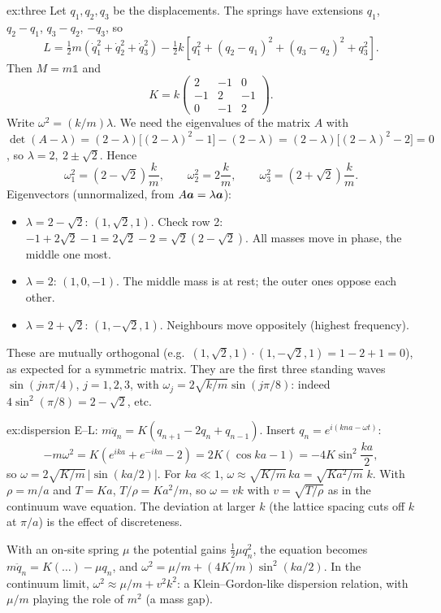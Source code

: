 \documentclass[11pt]{article}
\begin{document}
\begin{solution}{ex:three}
Let $q_1,q_2,q_3$ be the displacements. The springs have extensions $q_1$, $q_2-q_1$, $q_3-q_2$, $-q_3$, so
\[
 L=\tfrac12m(\dot q_1^2+\dot q_2^2+\dot q_3^2)-\tfrac12k\left[q_1^2+(q_2-q_1)^2+(q_3-q_2)^2+q_3^2\right].
\]
Then $M=m\mathbb 1$ and
\[
 K=k\begin{pmatrix}2&-1&0\\-1&2&-1\\0&-1&2\end{pmatrix}.
\]
Write $\omega^2=(k/m)\lambda$. We need the eigenvalues of the matrix $A$ with $\det(A-\lambda)=(2-\lambda)\bigl[(2-\lambda)^2-1\bigr]-(2-\lambda)=(2-\lambda)\bigl[(2-\lambda)^2-2\bigr]=0$, so $\lambda=2,\ 2\pm\sqrt2$. Hence
\[
 \omega_1^2=(2-\sqrt2)\frac km,\qquad \omega_2^2=2\frac km,\qquad \omega_3^2=(2+\sqrt2)\frac km .
\]
Eigenvectors (unnormalized, from $A\bm{a}=\lambda\bm{a}$):
\begin{itemize}[nosep]
 \item $\lambda=2-\sqrt2$: $(1,\sqrt2,1)$. Check row 2: $-1+2\sqrt2-1=2\sqrt2-2=\sqrt2(2-\sqrt2)$. All masses move in phase, the middle one most.
 \item $\lambda=2$: $(1,0,-1)$. The middle mass is at rest; the outer ones oppose each other.
 \item $\lambda=2+\sqrt2$: $(1,-\sqrt2,1)$. Neighbours move oppositely (highest frequency).
\end{itemize}
These are mutually orthogonal (e.g.\ $(1,\sqrt2,1)\cdot(1,-\sqrt2,1)=1-2+1=0$), as expected for a symmetric matrix. They are the first three standing waves $\sin(jn\pi/4)$, $j=1,2,3$, with $\omega_j=2\sqrt{k/m}\sin(j\pi/8)$: indeed $4\sin^2(\pi/8)=2-\sqrt2$, etc.
\end{solution}

\begin{solution}{ex:dispersion}
E--L: $m\ddot q_n=K(q_{n+1}-2q_n+q_{n-1})$. Insert $q_n=e^{i(kna-\omega t)}$:
\[
 -m\omega^2=K\left(e^{ika}+e^{-ika}-2\right)=2K(\cos ka-1)=-4K\sin^2\frac{ka}2 ,
\]
so $\omega=2\sqrt{K/m}\,|\sin(ka/2)|$. For $ka\ll1$, $\omega\approx\sqrt{K/m}\,ka=\sqrt{Ka^2/m}\;k$. With $\rho=m/a$ and $T=Ka$, $T/\rho=Ka^2/m$, so $\omega=vk$ with $v=\sqrt{T/\rho}$ as in the continuum wave equation. The deviation at larger $k$ (the lattice spacing cuts off $k$ at $\pi/a$) is the effect of discreteness.

With an on-site spring $\mu$ the potential gains $\tfrac12\mu q_n^2$, the equation becomes $m\ddot q_n=K(\ldots)-\mu q_n$, and $\omega^2=\mu/m+(4K/m)\sin^2(ka/2)$. In the continuum limit, $\omega^2\approx\mu/m+v^2k^2$: a Klein--Gordon-like dispersion relation, with $\mu/m$ playing the role of $m^2$ (a mass gap).
\end{solution}
\end{document}
